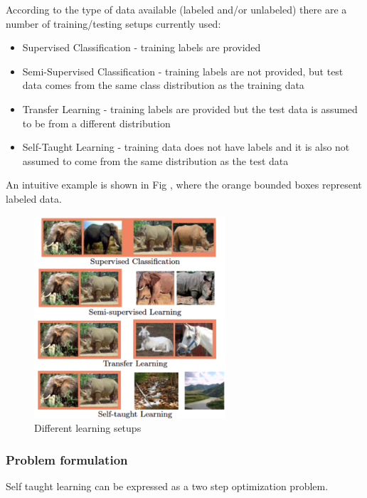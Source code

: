 \documentclass[10pt,journal,a4paper]{IEEEtran}
\begin{document}
According to the type of data available (labeled and/or unlabeled) there are a number of training/testing setups currently used:
\begin{itemize}
\item Supervised Classification - training labels are provided
\item Semi-Supervised Classification - training labels are not provided, but test data comes from the same class distribution as the training data
\item Transfer Learning - training labels are provided but the test data is assumed to be from a different distribution
\item Self-Taught Learning - training data does not have labels and it is also not assumed to come from the same distribution as the test data
\end{itemize}
An intuitive example is shown in Fig \label{fig_sim}, where the orange bounded boxes represent labeled data.
\begin{figure}[!t]
\centering
\includegraphics[width=2.8in]{selftaught.png}
\caption{Different learning setups}
\label{fig_sim}
\end{figure}


\subsubsection{Problem formulation}
Self taught learning can be expressed as a two step optimization problem.
\end{document}
